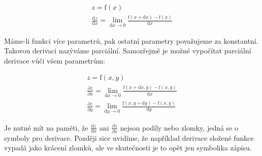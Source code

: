 \begin{equation}
\label{eq:definice_derivace}
\begin{split}
z =\mathrm{f}(x) \\
\frac{\mathrm{d}z}{\mathrm{d}x} = \lim_{\mathrm{d}x \to 0} \frac{\mathrm{f}(x + \mathrm{d}x) - \mathrm{f}(x)}{\mathrm{d}x}
\end{split}
\end{equation}

Máme-li funkci více parametrů, pak ostatní parametry považujeme za konstantní. Takovou derivaci nazýváme parciální. Samozřejmě je možné vypočítat parciální derivace vůči všem parametrům:

\begin{equation}
\begin{split}
z =\mathrm{f}(x, y) \\
\frac{\partial z}{\partial x} = \lim_{\mathrm{d}x \to 0} \frac{\mathrm{f}(x + \mathrm{d}x, y) - \mathrm{f}(x, y)}{\mathrm{d}x} \\
\frac{\partial z}{\partial y} = \lim_{\mathrm{d}y \to 0} \frac{\mathrm{f}(x, y + \mathrm{d}y) - \mathrm{f}(x, y)}{\mathrm{d}y}
\end{split}
\end{equation}

Je nutné mít na paměti, že \(\frac{\mathrm{d}z}{\mathrm{d}x}\) ani \(\frac{\partial z}{\partial x}\) nejsou podíly nebo zlomky, jedná se o symboly pro derivace. Později sice uvidíme, že například derivace složené funkce vypadá jako krácení zlomků, ale ve skutečnosti je to opět jen symbolika zápisu.

